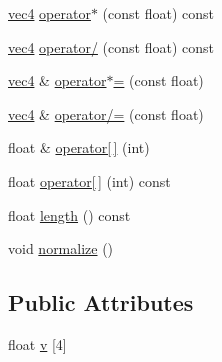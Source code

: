 \begin{DoxyCompactItemize}
\item 
\hyperlink{structvec4}{vec4} \hyperlink{structvec4_ac0899c2ebc9ec2e017034b41cf52d4ab}{operator$\ast$} (const float) const 
\item 
\hyperlink{structvec4}{vec4} \hyperlink{structvec4_af5b5276358f3c30bab7ebe177ed6bf1f}{operator/} (const float) const 
\item 
\hyperlink{structvec4}{vec4} \& \hyperlink{structvec4_acae68701758bc16a76dfea01a5f0a6ca}{operator$\ast$=} (const float)
\item 
\hyperlink{structvec4}{vec4} \& \hyperlink{structvec4_a829f38d68e61a06912fa0ecceea2f5b8}{operator/=} (const float)
\item 
float \& \hyperlink{structvec4_a5ac0a516e60ad3981d2ec759175c041e}{operator\mbox{[}$\,$\mbox{]}} (int)
\item 
float \hyperlink{structvec4_a58383345bb89ec9ea9951c17f3f700f7}{operator\mbox{[}$\,$\mbox{]}} (int) const 
\item 
float \hyperlink{structvec4_aa1c5dd86c8fbde45d6b6beabe45487e2}{length} () const 
\item 
void \hyperlink{structvec4_a8c0f2d44186f0eb32b6ced56af8ac9e8}{normalize} ()
\end{DoxyCompactItemize}
\subsection*{Public Attributes}
\begin{DoxyCompactItemize}
\item 
float \hyperlink{structvec4_a08f56ae363c0cabebd3fe446ef28e652}{v} \mbox{[}4\mbox{]}
\end{DoxyCompactItemize}


